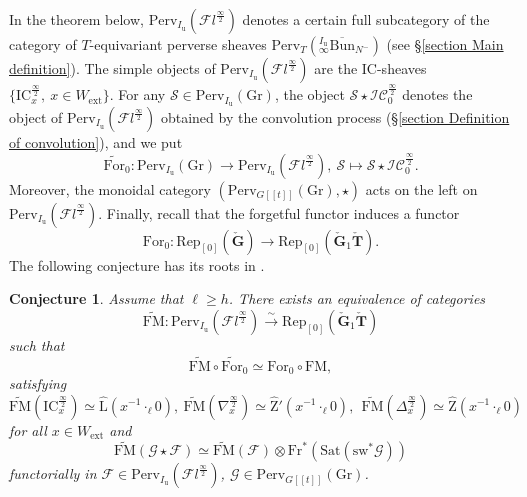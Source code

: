 \documentclass[11pt]{amsart}
\theoremstyle{plain}
\newtheorem{conj}{Conjecture}[section]
\theoremstyle{remark}
\numberwithin{equation}{section}
\begin{document}
 In the theorem below, $\mathrm{Perv}_{I_\mathrm{u}}(\mathcal{F}l^{\frac{\infty}{2}})$ denotes a certain full subcategory of the category of $T$-equivariant perverse sheaves $\mathrm{Perv}_{T}(^{I_\mathrm{u}}_\infty\overline{\mathrm{Bun}}_{N^-})$ (see §\ref{section Main definition}).  The simple objects of $\mathrm{Perv}_{I_\mathrm{u}}(\mathcal{F}l^{\frac{\infty}{2}})$ are the IC-sheaves $\{\mathrm{IC}_x^{\frac{\infty}{2}},~x\in W_\mathrm{ext}\}$. For any $\mathcal{S}\in\mathrm{Perv}_{I_\mathrm{u}}(\mathrm{Gr})$, the object $\mathcal{S}\star\mathcal{IC}^\frac{\infty}{2}_0$ denotes the object of $\mathrm{Perv}_{I_\mathrm{u}}(\mathcal{F}l^{\frac{\infty}{2}})$ obtained by the convolution process (§\ref{section Definition of convolution}), and we put $$\widetilde{\mathrm{For}}_0:\mathrm{Perv}_{I_\mathrm{u}}(\mathrm{Gr})\to \mathrm{Perv}_{I_\mathrm{u}}(\mathcal{F}l^{\frac{\infty}{2}}),~\mathcal{S}\mapsto\mathcal{S}\star\mathcal{IC}^\frac{\infty}{2}_0.$$
Moreover, the monoidal category $(\mathrm{Perv}_{G[[t]]}(\mathrm{Gr}),\star)$ acts on the left on $\mathrm{Perv}_{I_\mathrm{u}}(\mathcal{F}l^{\frac{\infty}{2}})$. Finally, recall that the forgetful functor induces a functor
 $$\mathrm{For}_0:\mathrm{Rep}_{[0]}(\check{\mathbf{G}})\to \mathrm{Rep}_{[0]}(\check{\mathbf{G}}_1\check{\mathbf{T}}). $$
 The following conjecture has its roots in \cite[§1.5]{finkelberg1997semiinfinite}.
 \begin{conj}\label{main conj}
    Assume that $\ell\geq h$. There exists an equivalence of categories 
     $$\widetilde{\mathrm{FM}}:\mathrm{Perv}_{I_\mathrm{u}}(\mathcal{F}l^{\frac{\infty}{2}})\xrightarrow{\sim}\mathrm{Rep}_{[0]}(\check{\mathbf{G}}_1\check{\mathbf{T}})$$
     such that
     $$\widetilde{\mathrm{FM}}\circ\widetilde{\mathrm{For}}_0\simeq \mathrm{For}_0\circ \mathrm{FM}, $$
     satisfying
     $$\widetilde{\mathrm{FM}}(\mathrm{IC}_x^{\frac{\infty}{2}})\simeq \widehat{\mathrm{L}}(x^{-1}\cdot_\ell0),~\widetilde{\mathrm{FM}}(\nabla_x^{\frac{\infty}{2}})\simeq \widehat{\mathrm{Z}}'(x^{-1}\cdot_\ell0),~~\widetilde{\mathrm{FM}}(\Delta_x^{\frac{\infty}{2}})\simeq \widehat{\mathrm{Z}}(x^{-1}\cdot_\ell0) $$
     for all $x\in W_\mathrm{ext}$ and
     $$\widetilde{\mathrm{FM}}(\mathcal{G}\star\mathcal{F})\simeq \widetilde{\mathrm{FM}}(\mathcal{F})\otimes\mathrm{Fr}^*(\mathrm{Sat}(\mathrm{sw}^*\mathcal{G})) $$
     functorially in $\mathcal{F}\in\mathrm{Perv}_{I_\mathrm{u}}(\mathcal{F}l^{\frac{\infty}{2}})$, $\mathcal{G}\in\mathrm{Perv}_{G[[t]]}(\mathrm{Gr})$.
 \end{conj}
\end{document}
